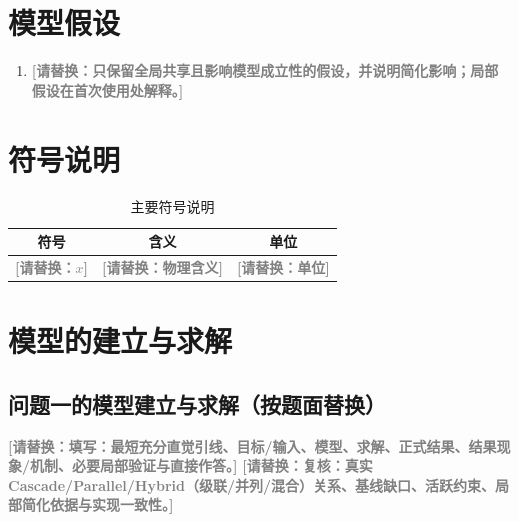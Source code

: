 \documentclass[12pt,a4paper]{ctexart}
\newcommand{\placeholder}[1]{\textcolor{gray}{\textbf{[请替换：#1]}}}
\begin{document}

\section{模型假设}
\begin{enumerate}
    \item \placeholder{只保留全局共享且影响模型成立性的假设，并说明简化影响；局部假设在首次使用处解释。}
\end{enumerate}

\section{符号说明}
\begin{table}[H]
\centering
\caption{主要符号说明}
\begin{tabular}{ccc}
\toprule
符号 & 含义 & 单位 \\
\midrule
\placeholder{$x$} & \placeholder{物理含义} & \placeholder{单位} \\
\bottomrule
\end{tabular}
\end{table}

\section{模型的建立与求解}
\subsection{问题一的模型建立与求解（按题面替换）}
\placeholder{填写：最短充分直觉引线、目标/输入、模型、求解、正式结果、结果现象/机制、必要局部验证与直接作答。}
\placeholder{复核：真实 Cascade/Parallel/Hybrid（级联/并列/混合）关系、基线缺口、活跃约束、局部简化依据与实现一致性。}
\end{document}
